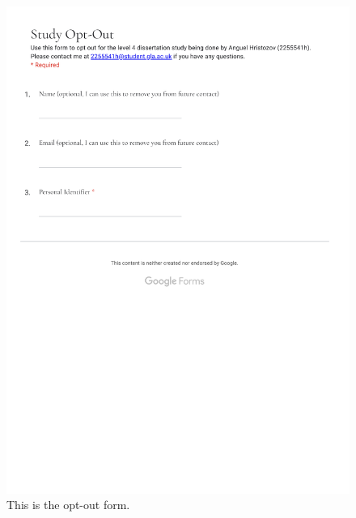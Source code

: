 \documentclass{l4proj}
\begin{document}
\begin{appendices}
\begin{figure}[htb]
    \includegraphics[width=\linewidth]{images/optout_form.pdf}
    \caption{This is the opt-out form.}
    \label{fig:opt_out} 
\end{figure}


\end{appendices}
\end{document}

